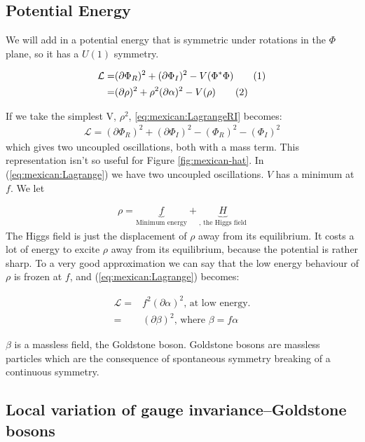 \documentclass[]{article}
\newcommand\numberthis{\addtocounter{equation}{1}\tag{\theequation}}
\begin{document}
\subsection{Potential Energy}
We will add in a potential energy that is symmetric under rotations in the $\Phi$ plane, so it has a $U(1)$ symmetry.

\begin{align*}
	\mathcal{L}	=&(\partial \Phi_R)^2 + (\partial \Phi_I)^2 - V(\Phi^*\Phi)  \numberthis \label{eq:mexican:LagrangeRI}\\
	=& (\partial \rho)^2 + \rho^2 (\partial \alpha)^2 - V(\rho) \numberthis \label{eq:mexican:Lagrange}
\end{align*} 

If we take the simplest V, $\rho^2$, \eqref{eq:mexican:LagrangeRI} becomes:
\begin{align*}
	\mathcal{L} = (\partial \Phi_R)^2 +  (\partial \Phi_I)^2 -(\Phi_R)^2  -(\Phi_I)^2
\end{align*}
which gives two uncoupled oscillations, both with a mass term. This representation isn't so useful for Figure \ref{fig:mexican-hat}. In (\ref{eq:mexican:Lagrange}) we have two uncoupled oscillations. $V$ has a minimum at $f$. We let

\begin{align*}
	\rho = \underbrace{f}_\text{Minimum energy} + \underbrace{H}_\text{, the Higgs field}
\end{align*}
The Higgs field is just the displacement of $\rho$ away from its equilibrium. It costs a lot of energy to excite $\rho$ away from its equilibrium, because the potential is rather sharp. To a very good approximation we can say that the low energy behaviour of $\rho$ is frozen at $f$, and (\ref{eq:mexican:Lagrange}) becomes:

\begin{align*}
	\mathcal{L} =& f^2(\partial \alpha)^2 \text{, at low energy.}\\
	=& (\partial \beta)^2 \text{, where $\beta = f \alpha$}
\end{align*}

$\beta$ is a massless field, the Goldstone boson. Goldstone bosons are massless particles which are the consequence of spontaneous symmetry breaking of a continuous symmetry.

\subsection{Local variation of gauge invariance--Goldstone bosons}
\end{document}
